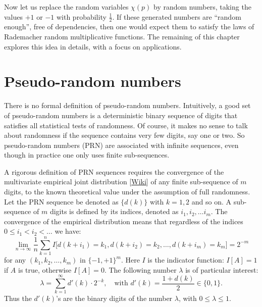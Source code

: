 \documentclass[oneside,10pt]{book}
\begin{document}
Now let us replace the random variables $\chi(p)$ 
by \textcolor{index}{random numbers}, 
taking the values $+1$
 or $-1$ with probability $\frac{1}{2}$. If these generated numbers are ``random enough'', free of dependencies, then one would expect them to 
 satisfy the laws of Rademacher random multiplicative functions. The remaining of this chapter explores this idea in
 details, with a focus on applications.  

\section{Pseudo-random numbers}\label{prozaxheliumgas}

There is no formal definition of pseudo-random numbers. Intuitively, a good set of pseudo-random numbers is a  
deterministic binary sequence of digits that satisfies all statistical tests of randomness. Of course, it makes no sense to talk about 
randomness if the sequence contains very few digits, say one or two. So pseudo-random numbers (PRN) are associated with
 infinite sequences, even though in practice one only uses finite sub-sequences.


A rigorous definition of PRN sequences requires the convergence of the 
multivariate \textcolor{index}{empirical joint distribution}
 [\href{https://en.wikipedia.org/wiki/Empirical_distribution_function}{Wiki}]
 of any finite sub-sequence of $m$ digits, to the known theoretical value under the assumption of full randomness.  Let the PRN 
sequence be denoted as $\{d(k)\}$ with $k=1,2$ and so on. A sub-sequence of $m$ digits is defined by its indices, denoted as $i_1,i_2,\dots i_m$.  The convergence of the empirical distribution means that regardless 
of the indices $0\leq i_1 < i_2< \dots$ we have:
\begin{equation}
 \lim_{n\rightarrow\infty} \frac{1}{n}\sum_{k=1}^n I\Big[d(k+i_1)=k_1,d(k+i_2)=k_2,\dots,d(k+i_m)=k_m\Big] = 2^{-m} \label{eqrdv}
\end{equation}
for any $(k_1,k_2,\dots,k_m)$ in $\{-1,+1\}^m$. Here $I$ is the indicator function: $I[A]=1$ if $A$ is true, otherwise $I[A]=0$. The following number $\lambda$ is of particular interest:
\begin{equation}
\lambda=\sum_{k=1}^\infty d'(k) \cdot 2^{-k}, \quad \text{with } d'(k)=\frac{1+d(k)}{2} \in \{0, 1\}. \label{zzxdx}
\end{equation}
Thus the $d'(k)$'s are the binary digits of the number $\lambda$, with $0\leq \lambda\leq 1$. 
\end{document}

